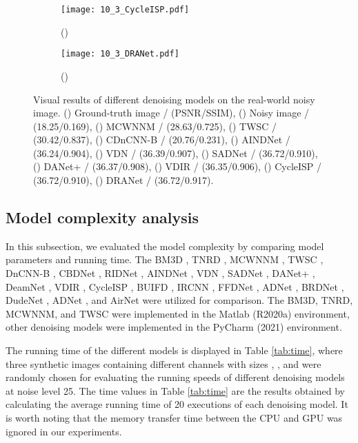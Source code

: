 \documentclass[3p,times]{elsarticle}
\begin{document}
\begin{figure*}[htbp]
	\begin{subfigure}{0.225\linewidth}
		\centering
		\texttt{[image: 10\_3\_CycleISP.pdf]}
		\caption{()}
	\end{subfigure}
    \centering
	\begin{subfigure}{0.225\linewidth}
		\centering
		\texttt{[image: 10\_3\_DRANet.pdf]}
		\caption{()}
	\end{subfigure}
\caption{Visual results of different denoising models on the real-world noisy image. () Ground-truth image / (PSNR/SSIM), () Noisy image / (18.25/0.169), () MCWNNM / (28.63/0.725), () TWSC / (30.42/0.837), () CDnCNN-B / (20.76/0.231), () AINDNet / (36.24/0.904), () VDN / (36.39/0.907), () SADNet / (36.72/0.910), () DANet+ / (36.37/0.908), () VDIR / (36.35/0.906), () CycleISP / (36.72/0.910), () DRANet / (36.72/0.917).}
\label{fig:10_3}
\end{figure*}

\subsection{Model complexity analysis}
In this subsection, we evaluated the model complexity by comparing model parameters and running time. The BM3D \cite{Dabov2007}, TNRD \cite{Chen2017}, MCWNNM \cite{Xu2017}, TWSC \cite{Xu2018}, DnCNN-B \cite{Zhang2017}, CBDNet \cite{Guo2019}, RIDNet \cite{Anwar2019}, AINDNet \cite{Kim2020}, VDN \cite{Yue2019}, SADNet \cite{Chang2020}, DANet+ \cite{Yue2020}, DeamNet \cite{Ren2021}, VDIR \cite{Soh2022}, CycleISP \cite{Zamir2020}, BUIFD \cite{Helou2020}, IRCNN \cite{ZhangZGZ2017}, FFDNet \cite{Zhang2018}, ADNet \cite{TianX2020}, BRDNet \cite{Tian2020}, DudeNet \cite{Tian2021}, ADNet \cite{TianX2020}, and AirNet \cite{Li2022} were utilized for comparison. The BM3D, TNRD, MCWNNM, and TWSC were implemented in the Matlab (R2020a) environment, other denoising models were implemented in the PyCharm (2021) environment.

The running time of the different models is displayed in Table \ref{tab:time}, where three synthetic images containing different channels with sizes , , and  were randomly chosen for evaluating the running speeds of different denoising models at noise level 25. The time values in Table \ref{tab:time} are the results obtained by calculating the average running time of 20 executions of each denoising model. It is worth noting that the memory transfer time between the CPU and GPU was ignored in our experiments.
\end{document}

